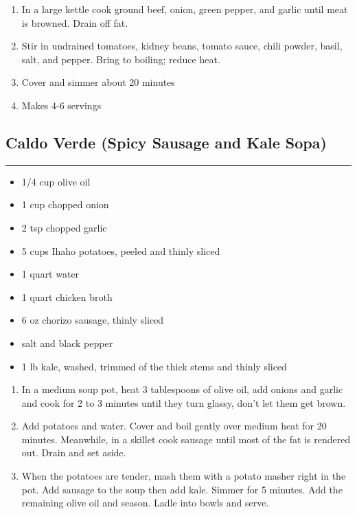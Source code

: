 \documentclass{article}
\begin{document}
\begin{enumerate}
    \item
        In a large kettle cook ground beef, onion, green pepper, and garlic until meat is browned. Drain off fat.
    \item
        Stir in undrained tomatoes, kidney beans, tomato sauce, chili powder, basil, salt, and pepper. Bring to boiling; reduce heat.
    \item
        Cover and simmer about 20 minutes
    \item
        Makes 4-6 servings
\end{enumerate}
\newpage

\subsection{Caldo Verde (Spicy Sausage and Kale Sopa)} 
\noindent\rule[0.5ex]{\linewidth}{1pt}

\begin{framed}
    \begin{itemize}
        \item 1/4 cup olive oil
        \item 1 cup chopped onion
        \item 2 tsp chopped garlic
        \item 5 cups Ihaho potatoes, peeled and thinly sliced
        \item 1 quart water
        \item 1 quart chicken broth
        \item 6 oz chorizo sausage, thinly sliced
        \item salt and black pepper
        \item 1 lb kale, washed, trimmed of the thick stems and thinly sliced
    \end{itemize}
\end{framed}

\begin{enumerate}
    \item 
        In a medium soup pot, heat 3 tablespoons of olive oil, add onions and garlic and cook for 2 to 3 minutes until they turn glassy, don't let them get brown. 
    \item 
        Add potatoes and water. Cover and boil gently over medium heat for 20 minutes. Meanwhile, in a skillet cook sausage until most of the fat is rendered out. Drain and set aside. 
    \item 
        When the potatoes are tender, mash them with a potato masher right in the pot. Add sausage to the soup then add kale. Simmer for 5 minutes. Add the remaining olive oil and season. Ladle into bowls and serve.
\end{enumerate}
\newpage
\end{document}
